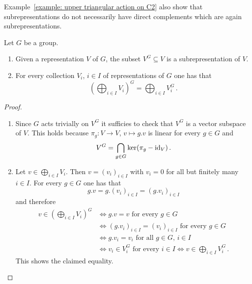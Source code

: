 \begin{warning}
  Example~\ref{example: upper triangular action on C2} also show that subrepresentations do not necessarily have direct complements which are again subrepresentations.
\end{warning}


\begin{lemma}\label{lemma: direct sum and invariants commute}
  Let $G$ be a group.
  \begin{enumerate}
    \item
      Given a representation $V$ of $G$, the subset $V^G \subseteq V$ is a subrepresentation of $V$.
    \item
      For every collection $V_i$, $i \in I$ of representations of $G$ one has that
      \[
          \left(
            \bigoplus_{i \in I} V_i
          \right)^G
        = \bigoplus_{i \in I} V_i^G \,.
      \]
  \end{enumerate}
\end{lemma}
\begin{proof}
  \leavevmode
  \begin{enumerate}
    \item
      Since $G$ acts trivially on $V^G$ it sufficies to check that $V^G$ is a vector subspace of $V$.
      This holds because $\pi_g \colon V \to V$, $v \mapsto g.v$ is linear for every $g \in G$ and
      \[
          V^G
        = \bigcap_{g \in G} \ker(\pi_g - \operatorname{id}_V) \,.
      \]
    \item
      Let $v \in \bigoplus_{i \in I} V_i$.
      Then $v = (v_i)_{i \in I}$ with $v_i = 0$ for all but finitely many $i \in I$.
      For every $g \in G$ one has that
      \[
          g.v
        = g.(v_i)_{i \in I}
        = (g.v_i)_{i \in I}
      \]
      and therefore
      \begin{align*}
              v \in \left( \bigoplus_{i \in I} V_i \right)^G
        &\iff \text{$g.v = v$ for every $g \in G$}  \\
        &\iff \text{$(g.v_i)_{i \in I} = (v_i)_{i \in I}$ for every $g \in G$} \\
        &\iff \text{$g.v_i = v_i$ for all $g \in G$, $i \in I$} \\
        &\iff \text{$v_i \in V_i^G$ for every $i \in I$}
         \iff v \in \bigoplus_{i \in I} V_i^G \,.
      \end{align*}
      This shows the claimed equality.
  \qedhere
  \end{enumerate}
\end{proof}


